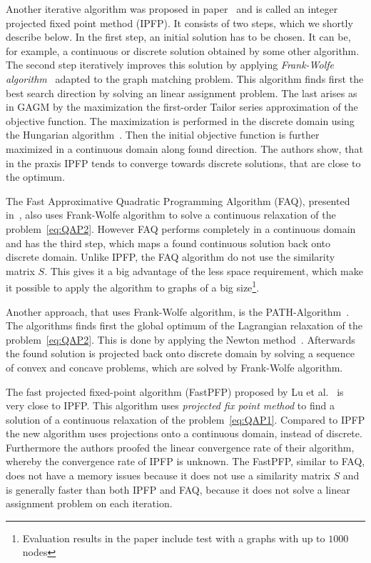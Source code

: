 Another iterative algorithm was proposed in paper~\cite{Leordeanu2009_IPFP} and is called an integer projected fixed point method (IPFP). It consists of two steps, which we shortly describe below. In the first step, an initial solution has to be chosen. It can be, for example, a continuous or discrete solution obtained by some other algorithm. The second step iteratively improves this solution by applying \emph{Frank-Wolfe algorithm}~\cite{Wolfe1956} adapted to the graph matching problem. This algorithm finds first the best search direction by solving an linear assignment problem. The last arises as in GAGM by the maximization the first-order Tailor series approximation of the objective function. The maximization is performed in the discrete domain using the Hungarian algorithm~\cite{Kuhn1955}. Then the initial objective function is further maximized in a continuous domain along found direction. The authors show, that in the praxis IPFP tends to converge towards discrete solutions, that are close to the optimum.

The Fast Approximative Quadratic Programming Algorithm (FAQ), presented in~\cite{Vogelstein_BrainGraphs}, also uses Frank-Wolfe algorithm to solve a continuous relaxation of the problem~\eqref{eq:QAP2}. However FAQ performs completely in a continuous domain and has the third step, which maps a found continuous solution back onto discrete domain. Unlike IPFP, the FAQ algorithm do not use the similarity matrix $S$. This gives it a big advantage of the less space requirement, which make it possible to apply the algorithm to graphs of a big size\footnote{Evaluation results in the paper include test with a graphs with up to $1000$ nodes}. 

Another approach, that uses Frank-Wolfe algorithm, is the PATH-Algorithm~\cite{Zaslavskiy2010}. The algorithms finds first the global optimum of the Lagrangian relaxation of the problem~\eqref{eq:QAP2}. This is done by applying the Newton method~\cite{Book_ConvOpt}. Afterwards the found solution is projected back onto discrete domain by solving a sequence of convex and concave problems, which are solved by Frank-Wolfe algorithm.

The fast projected fixed-point algorithm (FastPFP) proposed by Lu et al.~\cite{FastPFP} is very close to IPFP. This algorithm uses \emph{projected fix point method} to find a solution of a continuous relaxation of the problem~\eqref{eq:QAP1}. Compared to IPFP the new algorithm uses projections onto a continuous domain, instead of discrete. Furthermore the authors proofed the linear convergence rate of their algorithm, whereby the convergence rate of IPFP is unknown. The FastPFP, similar to FAQ, does not have a memory issues because it does not use a similarity matrix $S$ and is generally faster than both IPFP and FAQ, because it does not solve a linear assignment problem on each iteration.

